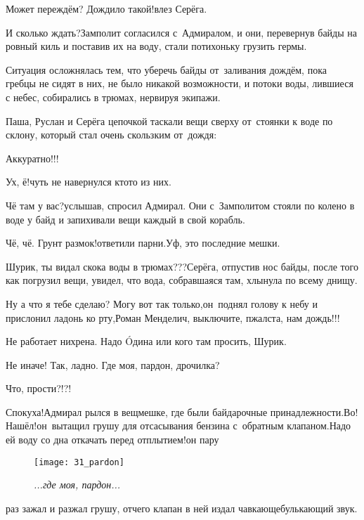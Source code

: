 \diagdash Может переждём? Дождило такой!\mdash влез Серёга.

\diagdash И сколько ждать?\mdash Замполит согласился с~Адмиралом, и они, перевернув байды на ровный киль и поставив их на воду, стали потихоньку грузить гермы. 

Ситуация осложнялась тем, что уберечь байды от~заливания дождём, пока гребцы не сидят в них, не было никакой возможности, и потоки воды, лившиеся с небес, собирались в трюмах, нервируя экипажи.

Паша, Руслан и Серёга цепочкой таскали вещи сверху от~стоянки к воде по склону, который стал очень скользким от~дождя:

\diagdash Аккуратно!!!

\diagdash Ух, ё!\mdash чуть не навернулся кто\sdash то из них.

\diagdash Чё там у вас?\mdash услышав, спросил Адмирал. Они с~Замполитом стояли по колено в воде у байд и запихивали вещи каждый в свой корабль.

\diagdash Чё, чё. Грунт размок!\mdash ответили парни.\mdash Уф, это последние мешки.

\diagdash Шурик, ты видал скока воды в трюмах???\mdash Серёга, отпустив нос байды, после того как погрузил вещи, увидел, что вода, собравшаяся там, хлынула по всему днищу.

\diagdash Ну а что я тебе сделаю? Могу вот так только,\mdash он~поднял голову к небу и прислонил ладонь ко рту,\mdash Роман Менделич, выключите, п\sdash жалста, нам дождь!!!

\diagdash Не работает нихрена. Надо {\'{O}}дина или кого там просить, Шурик.

\diagdash Не иначе! Так, ладно. Где моя, пардон, дрочилка?

\diagdash Что, прости?!?!

\diagdash Спокуха!\mdash Адмирал рылся в вещмешке, где были байдарочные принадлежности.\mdash Во! Нашёл!\mdash он~вытащил грушу для отсасывания бензина с~обратным клапаном.\mdash Надо ей воду со дна откачать перед отплытием!\mdash он пару \begin{wrapfigure}[12]{l}{0.50\textwidth}
	\centering
	\texttt{[image: 31\_pardon]}
	\caption{\small\textit{...где моя, пардон...}}
\end{wrapfigure}раз зажал и разжал грушу, отчего клапан в ней издал чавкающе\sdash булькающий звук.

